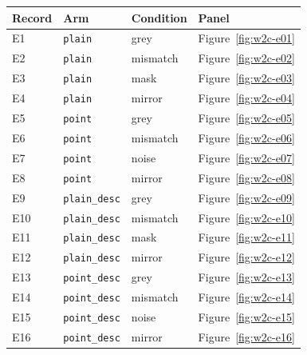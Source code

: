 \begin{center}
\small
\begin{tabular}{llll}
\toprule
Record & Arm & Condition & Panel \\
\midrule
E1 & \texttt{plain} & grey & Figure~\ref{fig:w2c-e01} \\
E2 & \texttt{plain} & mismatch & Figure~\ref{fig:w2c-e02} \\
E3 & \texttt{plain} & mask & Figure~\ref{fig:w2c-e03} \\
E4 & \texttt{plain} & mirror & Figure~\ref{fig:w2c-e04} \\
E5 & \texttt{point} & grey & Figure~\ref{fig:w2c-e05} \\
E6 & \texttt{point} & mismatch & Figure~\ref{fig:w2c-e06} \\
E7 & \texttt{point} & noise & Figure~\ref{fig:w2c-e07} \\
E8 & \texttt{point} & mirror & Figure~\ref{fig:w2c-e08} \\
E9 & \texttt{plain\_desc} & grey & Figure~\ref{fig:w2c-e09} \\
E10 & \texttt{plain\_desc} & mismatch & Figure~\ref{fig:w2c-e10} \\
E11 & \texttt{plain\_desc} & mask & Figure~\ref{fig:w2c-e11} \\
E12 & \texttt{plain\_desc} & mirror & Figure~\ref{fig:w2c-e12} \\
E13 & \texttt{point\_desc} & grey & Figure~\ref{fig:w2c-e13} \\
E14 & \texttt{point\_desc} & mismatch & Figure~\ref{fig:w2c-e14} \\
E15 & \texttt{point\_desc} & noise & Figure~\ref{fig:w2c-e15} \\
E16 & \texttt{point\_desc} & mirror & Figure~\ref{fig:w2c-e16} \\
\bottomrule
\end{tabular}
\end{center}

